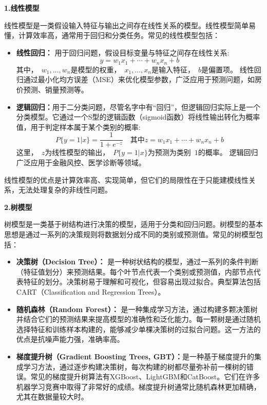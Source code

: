 {\bf 1.线性模型}

线性模型是一类假设输入特征与输出之间存在线性关系的模型。线性模型简单易懂，计算效率高，通常用于回归和分类任务。常见的线性模型包括：
\begin{itemize}
\item {\bf 线性回归：} 用于回归问题，假设目标变量与特征之间存在线性关系:
$$
y =w_1x_1+\cdots+ w_nx_n+b
$$
其中，~$w_1,\dots, w_n$是模型的权重，~$x_1,\dots,x_n$是输入特征，~$b$是偏置项。
线性回归通过最小化均方误差（MSE）来优化模型参数，广泛应用于预测问题，如房价预测、销量预测等。

\item  {\bf 逻辑回归：}用于二分类问题，尽管名字中有“回归”，但逻辑回归实际上是一个分类模型。它通过一个S型的逻辑函数（sigmoid函数）将线性输出转化为概率值，用于判定样本属于某个类别的概率:
$$
P\{ y=1 |x\} = \frac{1}{1+e^{-z}} \quad \mbox{其中} z =w_1x_1+\cdots+ w_nx_n+b
$$
这里，~$z$为线性模型的输出，~$P\{ y=1 |x\} $为预测为类别~$1$的概率。
逻辑回归广泛应用于金融风控、医学诊断等领域。
\end{itemize}
线性模型的优点是计算效率高、实现简单，但它们的局限性在于只能建模线性关系，无法处理复杂的非线性问题。

{\bf 2.树模型}

树模型是一类基于树结构进行决策的模型，适用于分类和回归问题。树模型的基本思想是通过一系列的决策规则将数据划分成不同的类别或预测值。常见的树模型包括：

\begin{itemize}
\item  {\bf 决策树（Decision Tree）：} 是一种树状结构的模型，通过一系列的条件判断（特征值划分）来预测结果。每个叶节点代表一个类别或预测值，内部节点代表特征的划分。决策树易于理解和可视化，但容易出现过拟合。典型算法包括CART（Classification and Regression Trees）。


\item  {\bf  随机森林（Random Forest）： }是一种集成学习方法，通过构建多颗决策树并结合它们的预测结果来提高模型的准确性和泛化能力。每一颗树是通过随机选择特征和训练样本构建的，能够减少单棵决策树的过拟合问题。这一方法的优点是抗噪声能力强，准确率高。

\item  {\bf  梯度提升树（Gradient Boosting Trees, GBT）：}是一种基于梯度提升的集成学习方法，通过逐步构建决策树，每次构建的树都尽量弥补前一棵树的错误。常见的梯度提升树算法有XGBoost、LightGBM和CatBoost。它们在许多机器学习竞赛中取得了非常好的成绩。梯度提升树通常比随机森林更加精确，尤其在数据量较大时。
\end{itemize}

